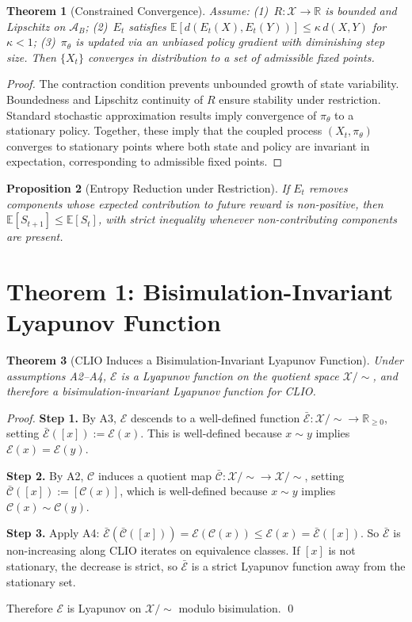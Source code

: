 \documentclass[11pt, letterpaper]{article}
\theoremstyle{plain}
\newtheorem{theorem}{Theorem}[section]
\newtheorem{proposition}[theorem]{Proposition}
\theoremstyle{definition}
\theoremstyle{remark}
\newcommand{\CC}{\mathcal{C}}
\newcommand{\EE}{\mathcal{E}}
\newcommand{\Adm}{\mathcal{A}}
\begin{document}
\begin{theorem}[Constrained Convergence]
\label{thm:cc}
Assume: (1)~$R: \mathcal{X} \to \mathbb{R}$ is bounded and Lipschitz on $\Adm_B$;
(2)~$E_t$ satisfies $\mathbb{E}[d(E_t(X), E_t(Y))] \leq \kappa\, d(X,Y)$ for $\kappa < 1$;
(3)~$\pi_\theta$ is updated via an unbiased policy gradient with diminishing step size.
Then $\{X_t\}$ converges in distribution to a set of admissible fixed points.
\end{theorem}

\begin{proof}
The contraction condition prevents unbounded growth of state variability. Boundedness
and Lipschitz continuity of $R$ ensure stability under restriction. Standard stochastic
approximation results imply convergence of $\pi_\theta$ to a stationary policy.
Together, these imply that the coupled process $(X_t, \pi_\theta)$ converges to
stationary points where both state and policy are invariant in expectation, corresponding
to admissible fixed points.
\end{proof}

\begin{proposition}[Entropy Reduction under Restriction]
\label{prop:entropy}
If $E_t$ removes components whose expected contribution to future reward is
non-positive, then $\mathbb{E}[S_{t+1}] \leq \mathbb{E}[S_t]$, with strict inequality
whenever non-contributing components are present.
\end{proposition}

\section{Theorem 1: Bisimulation-Invariant Lyapunov Function}

\begin{theorem}[CLIO Induces a Bisimulation-Invariant Lyapunov Function]
\label{thm:lyapunov}
Under assumptions A2--A4, $\EE$ is a Lyapunov function on the quotient space
$\mathcal{X}/{\sim}$, and therefore a bisimulation-invariant Lyapunov function for
CLIO.
\end{theorem}

\begin{proof}
\textbf{Step 1.} By A3, $\EE$ descends to a well-defined function
$\bar{\EE}: \mathcal{X}/{\sim} \to \mathbb{R}_{\geq 0}$, setting
$\bar{\EE}([x]) := \EE(x)$. This is well-defined because $x \sim y$ implies
$\EE(x) = \EE(y)$.

\textbf{Step 2.} By A2, $\CC$ induces a quotient map
$\bar{\CC}: \mathcal{X}/{\sim} \to \mathcal{X}/{\sim}$, setting
$\bar{\CC}([x]) := [\CC(x)]$, which is well-defined because $x \sim y$ implies
$\CC(x) \sim \CC(y)$.

\textbf{Step 3.} Apply A4:
$\bar{\EE}(\bar{\CC}([x])) = \EE(\CC(x)) \leq \EE(x) = \bar{\EE}([x])$.
So $\bar{\EE}$ is non-increasing along CLIO iterates on equivalence classes. If $[x]$
is not stationary, the decrease is strict, so $\bar{\EE}$ is a strict Lyapunov
function away from the stationary set.

Therefore $\EE$ is Lyapunov on $\mathcal{X}/{\sim}$ modulo bisimulation. \qed
\end{proof}
\end{document}
